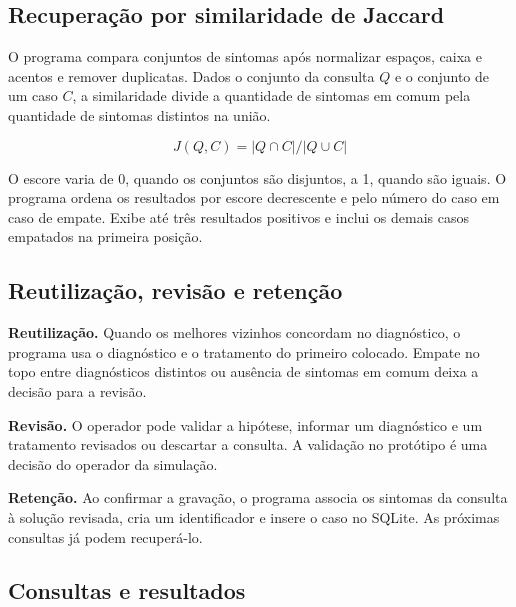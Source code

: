 \documentclass[12pt,a4paper]{article}
\begin{document}
\subsection{Recuperação por similaridade de Jaccard}

O programa compara conjuntos de sintomas após normalizar espaços, caixa e acentos e remover duplicatas. Dados o conjunto da consulta $Q$ e o conjunto de um caso $C$, a similaridade divide a quantidade de sintomas em comum pela quantidade de sintomas distintos na união.

\[
J(Q, C) = |Q \cap C| / |Q \cup C|
\]

O escore varia de 0, quando os conjuntos são disjuntos, a 1, quando são iguais. O programa ordena os resultados por escore decrescente e pelo número do caso em caso de empate. Exibe até três resultados positivos e inclui os demais casos empatados na primeira posição.

\subsection{Reutilização, revisão e retenção}

\textbf{Reutilização.} Quando os melhores vizinhos concordam no diagnóstico, o programa usa o diagnóstico e o tratamento do primeiro colocado. Empate no topo entre diagnósticos distintos ou ausência de sintomas em comum deixa a decisão para a revisão.

\textbf{Revisão.} O operador pode validar a hipótese, informar um diagnóstico e um tratamento revisados ou descartar a consulta. A validação no protótipo é uma decisão do operador da simulação.

\textbf{Retenção.} Ao confirmar a gravação, o programa associa os sintomas da consulta à solução revisada, cria um identificador e insere o caso no SQLite. As próximas consultas já podem recuperá-lo.

\subsection{Consultas e resultados}
\end{document}

